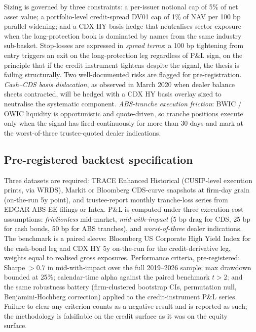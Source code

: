 \documentclass[11pt,a4paper]{article}
\begin{document}
Sizing is governed by three constraints: a per-issuer notional cap of 5\% of net asset value; a portfolio-level credit-spread DV01 cap of 1\% of NAV per 100 bp parallel widening; and a CDX HY basis hedge that neutralises sector exposure when the long-protection book is dominated by names from the same industry sub-basket. Stop-losses are expressed in \emph{spread terms}: a 100 bp tightening from entry triggers an exit on the long-protection leg regardless of P\&L sign, on the principle that if the credit instrument tightens despite the signal, the thesis is failing structurally. Two well-documented risks are flagged for pre-registration. \textit{Cash--CDS basis dislocation}, as observed in March 2020 when dealer balance sheets contracted, will be hedged with a CDX HY basis overlay sized to neutralise the systematic component. \textit{ABS-tranche execution friction}: BWIC / OWIC liquidity is opportunistic and quote-driven, so tranche positions execute only when the signal has fired continuously for more than 30 days and mark at the worst-of-three trustee-quoted dealer indications.

\subsection*{Pre-registered backtest specification}

Three datasets are required: TRACE Enhanced Historical (CUSIP-level execution prints, via WRDS), Markit or Bloomberg CDS-curve snapshots at firm-day grain (on-the-run 5y point), and trustee-report monthly tranche-loss series from EDGAR ABS-EE filings or Intex. P\&L is computed under three execution-cost assumptions: \emph{frictionless} mid-market, \emph{mid-with-impact} (5 bp drag for CDS, 25 bp for cash bonds, 50 bp for ABS tranches), and \emph{worst-of-three} dealer indications. The benchmark is a paired sleeve: Bloomberg US Corporate High Yield Index for the cash-bond leg and CDX HY 5y on-the-run for the credit-derivative leg, weights equal to realised gross exposures. Performance criteria, pre-registered: Sharpe $> 0.7$ in mid-with-impact over the full 2019--2026 sample; max drawdown bounded at 25\%; calendar-time alpha against the paired benchmark $t > 2$; and the same robustness battery (firm-clustered bootstrap CIs, permutation null, Benjamini-Hochberg correction) applied to the credit-instrument P\&L series. Failure to clear any criterion counts as a negative result and is reported as such; the methodology is falsifiable on the credit surface as it was on the equity surface.
\end{document}
